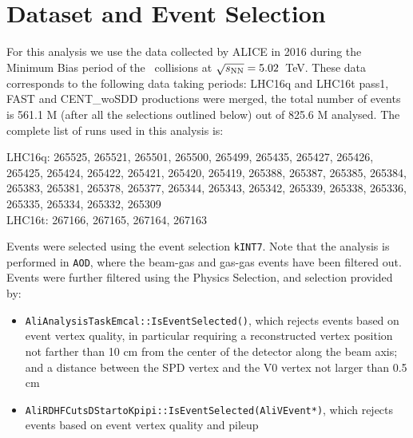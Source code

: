
\section{Dataset and Event Selection}

For this analysis we use the data collected by ALICE in 2016 during the Minimum Bias period of the \pPb\ collisions at $\sqrt{s_{\rm NN}}=5.02$~TeV. These data corresponds to the following data taking periods:
LHC16q and LHC16t pass1, FAST and CENT\_woSDD productions were merged, the total number of events is 561.1 M (after all the selections outlined below) out of 825.6 M analysed.
The complete list of runs used in this analysis is:

LHC16q: 265525, 265521, 265501, 265500, 265499, 265435, 265427, 265426, 265425, 265424, 265422, 265421, 265420, 265419, 265388, 265387, 265385, 265384, 265383, 265381, 265378, 265377, 265344, 265343, 265342, 265339, 265338, 265336, 265335, 265334, 265332, 265309  \\
LHC16t: 267166, 267165, 267164, 267163 

Events were selected using the event selection \texttt{kINT7}. Note that the analysis is performed in \texttt{AOD}, where the beam-gas and gas-gas events have been filtered out.
Events were further filtered using the Physics Selection, and selection provided by:
\begin{itemize}
\item \texttt{AliAnalysisTaskEmcal::IsEventSelected()}, which rejects events based on event vertex quality, in particular requiring a reconstructed vertex position not farther than 10 cm from the center of the detector along the beam axis; and a distance between the SPD vertex and the V0 vertex not larger than 0.5 cm %
\item \texttt{AliRDHFCutsDStartoKpipi::IsEventSelected(AliVEvent*)}, which rejects events based on event vertex quality 
and pileup 
\end{itemize}

